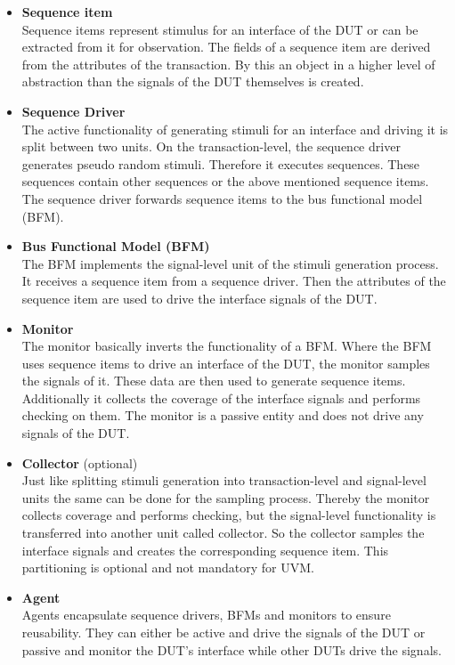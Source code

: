 \begin{itemize}
  \item \textbf{Sequence item}\\
  Sequence items represent stimulus for an interface of the DUT or can be extracted from it for observation.
  The fields of a sequence item are derived from the attributes of the transaction.
  By this an object in a higher level of abstraction than the signals of the DUT themselves is created.
  \item \textbf{Sequence Driver}\\
  The active functionality of generating stimuli for an interface and driving it is split between two units.
  On the transaction-level, the sequence driver generates pseudo random stimuli.
  Therefore it executes sequences.
  These sequences contain other sequences or the above mentioned sequence items. 
  The sequence driver forwards sequence items to the bus functional model (BFM).
  \item \textbf{Bus Functional Model (BFM)}\\
  The BFM implements the signal-level unit of the stimuli generation process.
  It receives a sequence item from a sequence driver. 
  Then the attributes of the sequence item are used to drive the interface signals of the DUT.
  \item \textbf{Monitor}\\
  The monitor basically inverts the functionality of a BFM. 
  Where the BFM uses sequence items to drive an interface of the DUT, the monitor samples the signals of it.
  These data are then used to generate sequence items.
  Additionally it collects the coverage of the interface signals and performs checking on them.
  The monitor is a passive entity and does not drive any signals of the DUT.
  \item \textbf{Collector} (optional)\\
  Just like splitting stimuli generation into transaction-level and signal-level units the same can be done for the sampling process. 
  Thereby the monitor collects coverage and performs checking, but the signal-level functionality is transferred into another unit called collector.
  So the collector samples the interface signals and creates the corresponding sequence item.
  This partitioning is optional and not mandatory for UVM.
  \item \textbf{Agent}\\
  Agents encapsulate sequence drivers, BFMs and monitors to ensure reusability.
  They can either be active and drive the signals of the DUT or passive and monitor the DUT's interface while other DUTs drive the signals.

\end{itemize}
